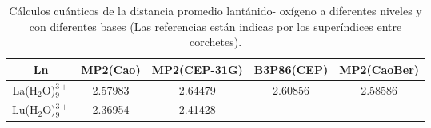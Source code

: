 \begin{center}                                                                            
 \begin{table}[h!]\label{t2}                                                               
 \caption{\footnotesize C\'alculos cu\'anticos de la distancia promedio 
 lant\'anido- ox\'igeno a diferentes niveles y con diferentes bases 
 (Las referencias est\'an indicas por los super\'indices entre corchetes).}                                                                  
 \begin{tabular}{c|cccc}\hline\hline                                                          
    Ln              & MP2(Cao) &  MP2(CEP-31G) & B3P86(CEP) & MP2(CaoBer) \\ \hline
La(H$_2$O)$_9^{3+}$ & 2.57983  &  2.64479      & 2.60856    & 2.58586     \\
Lu(H$_2$O)$_9^{3+}$ & 2.36954  &  2.41428      &            &             \\ \hline 
\end{tabular}
\end{table}                                                           
 \end{center}                                                                              

